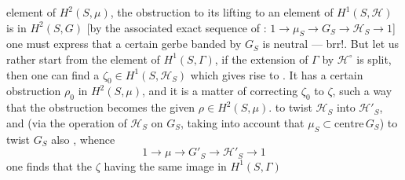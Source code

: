 element of $H^2(S,\mu)$, the obstruction to its
lifting to an element \inserted{$\zeta$} of $H^1(S,\mathcal H)$ is
in $H^2(S,G)$ [by the associated exact sequence
of  : $1\longrightarrow\mu_S\longrightarrow G_S\longrightarrow\mathcal H_S\longrightarrow1$]
one must express that a certain  gerbe
banded by $G_S$ is neutral --- brr!. But
let us rather start from the element \inserted{\unsure{$\omega$|$\widetilde\zeta$}} of $H^1(S,\Gamma)$,
if the extension of $\Gamma$ by $\mathcal H^\circ$ is split, then
one can find a $\zeta_0\in H^1(S,\mathcal H_S)$ which
gives rise to \unsure{$\omega$}. It has a certain
obstruction $\rho_0$ in $H^2(S,\mu)$, and it is a matter
of correcting $\zeta_0$ to $\zeta$,  such a way that
the obstruction becomes the given $\rho\in H^2(S,\mu)$.
  to twist $\mathcal H_S$ into
$\mathcal H'_S$, and (via the operation of $\mathcal H_S$  on $G_S$,
taking into account that $\mu_S\subset\mathrm{centre}\,G_S$) to
twist $G_S$ also , whence
\[
1\longrightarrow\mu\longrightarrow G'_S\longrightarrow\mathcal H'_S\longrightarrow1
\]
one finds that the $\zeta$ having the same image in $H^1(S,\Gamma)$
